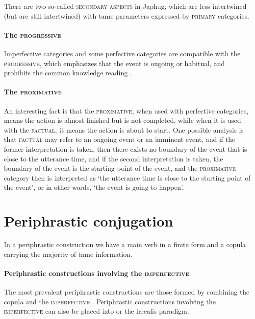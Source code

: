 \documentclass[a4paper, oneside, 12pt]{report}
\newcommand*{\citepage}[1]{p.~{#1}}
\newcommand{\category}[1]{\textsc{#1}}
\newcommand{\translate}[1]{`#1'}
\begin{document}
There are two so-called \category{secondary aspects} in Japhug,
which are less intertwined (but are still intertwined) 
with \ac{tame} parameters expressed by \category{primary} categories.

\paragraph*{The \category{progressive}}
Imperfective categories and some perfective categories
are compatible with the \category{progressive},
which emphasizes that the event is ongoing or habitual,
and prohibits the common knowledge reading
\citep[\citepage{1161}]{jacques2021grammar}. 

\paragraph*{The \category{proximative}}
\label{sec:tame.secondary.proximative}
An interesting fact is that the \category{proximative},
when used with perfective categories,
means the action is almost finished but is not completed,
while when it is used with the \category{factual},
it means the action is about to start.
One possible analysis is that 
\category{factual} may refer to an ongoing event or an imminent event,
and if the former interpretation is taken,
then there exists no boundary of the event
that is close to the utterance time,
and if the second interpretation is taken,
the boundary of the event is the starting point of the event,
and the \category{proximative} category
then is interpreted as \translate{the utterance time is close to the starting point of the event},
or in other words, \translate{the event is going to happen}.

\section{Periphrastic conjugation} 

In a periphrastic construction we have a main verb in a finite form 
and a copula carrying the majority of \ac{tame} information.

\paragraph*{Periphrastic constructions involving the \category{imperfective}}
The most prevalent periphrastic constructions 
are those formed by combining the copula and the \category{imperfective} 
\citep[\citepage{1089}]{jacques2021grammar}.
Periphrastic constructions involving the \category{imperfective}
can also be placed into  or the irrealis paradigm.
\end{document}
